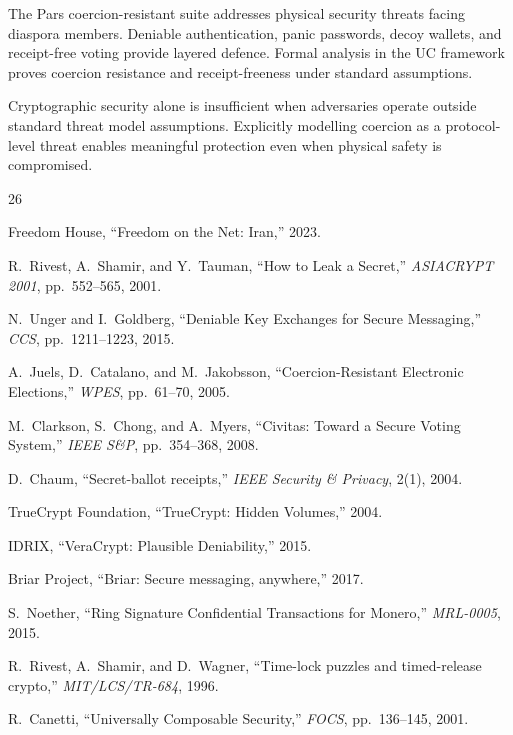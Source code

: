 \documentclass[11pt,a4paper]{article}
\begin{document}
The Pars coercion-resistant suite addresses physical security threats
facing diaspora members.  Deniable authentication, panic passwords, decoy
wallets, and receipt-free voting provide layered defence.  Formal analysis
in the UC framework proves coercion resistance and receipt-freeness under
standard assumptions.

Cryptographic security alone is insufficient when adversaries operate
outside standard threat model assumptions.  Explicitly modelling coercion
as a protocol-level threat enables meaningful protection even when physical
safety is compromised.


\begin{thebibliography}{26}

Freedom House,
``Freedom on the Net: Iran,''
2023.

R.~Rivest, A.~Shamir, and Y.~Tauman,
``How to Leak a Secret,''
\emph{ASIACRYPT 2001}, pp.~552--565, 2001.

N.~Unger and I.~Goldberg,
``Deniable Key Exchanges for Secure Messaging,''
\emph{CCS}, pp.~1211--1223, 2015.

A.~Juels, D.~Catalano, and M.~Jakobsson,
``Coercion-Resistant Electronic Elections,''
\emph{WPES}, pp.~61--70, 2005.

M.~Clarkson, S.~Chong, and A.~Myers,
``Civitas: Toward a Secure Voting System,''
\emph{IEEE S\&P}, pp.~354--368, 2008.

D.~Chaum,
``Secret-ballot receipts,''
\emph{IEEE Security \& Privacy}, 2(1), 2004.

TrueCrypt Foundation,
``TrueCrypt: Hidden Volumes,''
2004.

IDRIX,
``VeraCrypt: Plausible Deniability,''
2015.

Briar Project,
``Briar: Secure messaging, anywhere,''
2017.

S.~Noether,
``Ring Signature Confidential Transactions for Monero,''
\emph{MRL-0005}, 2015.

R.~Rivest, A.~Shamir, and D.~Wagner,
``Time-lock puzzles and timed-release crypto,''
\emph{MIT/LCS/TR-684}, 1996.

R.~Canetti,
``Universally Composable Security,''
\emph{FOCS}, pp.~136--145, 2001.


\end{thebibliography}
\end{document}

